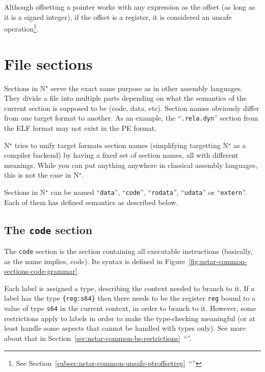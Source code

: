 Although offsetting a pointer works with any expression as the offset (as long as it is a signed integer), if the offset is a register, it is considered an unsafe operation\footnote{See Section~\ref{subsec:nstar-common-unsafe-ptroffsetreg}~``''}.

\section{File sections}\label{sec:nstar-common-sections}

Sections in N$^\star$ serve the exact same purpose as in other assembly languages. They divide a file into multiple parts depending on what the semantics of the current section is supposed to be (code, data, etc).
Section names obviously differ from one target format to another. As an example, the ``\texttt{.rela.dyn}'' section from the ELF format may not exist in the PE format.

N$^\star$ tries to unify target formats section names (simplifying targetting N$^\star$ as a compiler backend) by having a fixed set of section names, all with different meanings. While you can put anything anywhere in classical assembly languages, this is not the case in N$^\star$.

Sections in N$^\star$ can be named ``\texttt{data}'', ``\texttt{code}'', ``\texttt{rodata}'', ``\texttt{udata}'' or ``\texttt{extern}''. Each of them has defined semantics as described below.

\subsection{The \texttt{code} section}\label{subsec:nstar-common-sections-code}

The \texttt{code} section is the section containing all executable instructions (basically, as the name implies, code).
Its syntax is defined in Figure~\ref{fig:nstar-common-sections-code-grammar}.

Each label is assigned a type, describing the context needed to branch to it.
If a label has the type \texttt{\{reg:s64\}} then there needs to be the register \texttt{reg} bound to a value of type \texttt{s64} in the current context, in order to branch to it.
However, some restrictions apply to labels in order to make the type-checking meaningful (or at least handle some aspects that cannot be handled with types only). See more about that in Section~\ref{sec:nstar-common-bs-restrictions}~``''.

